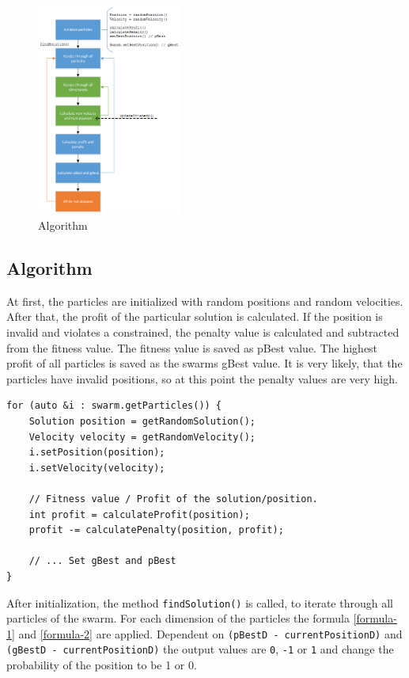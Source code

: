 \documentclass{article}
\begin{document}
\begin{figure}[H]
    \centering
    \includegraphics[width=180px]{images/algo.png}
    \caption{Algorithm}
    \label{fig-algo}
\end{figure}

\subsection{Algorithm}
At first, the particles are initialized with random positions and random velocities. After that, the profit of the particular solution is calculated. If the position is invalid and violates a constrained, the penalty value is calculated and subtracted from the fitness value. The fitness value is saved as pBest value. The highest profit of all particles is saved as the swarms gBest value. It is very likely, that the particles have invalid positions, so at this point the penalty values are very high.

\begin{lstlisting}[caption="Solver.cpp"]
for (auto &i : swarm.getParticles()) {
	Solution position = getRandomSolution();
   	Velocity velocity = getRandomVelocity();
	i.setPosition(position);
	i.setVelocity(velocity);
	
	// Fitness value / Profit of the solution/position.
	int profit = calculateProfit(position);
	profit -= calculatePenalty(position, profit);
	
	// ... Set gBest and pBest
}
\end{lstlisting}

After initialization, the method \lstinline$findSolution()$ is called, to iterate through all particles of the swarm. For each dimension of the particles the formula \ref{formula-1} and \ref{formula-2} are applied. Dependent on \lstinline{(pBestD - currentPositionD)} and \lstinline{(gBestD - currentPositionD)} the output values are \lstinline$0$, \lstinline$-1$ or \lstinline$1$ and change the probability of the position to be 1 or 0.\\
\end{document}
